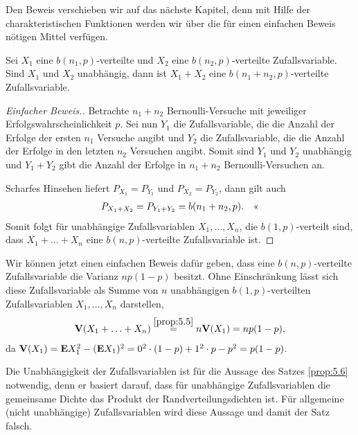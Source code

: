 Den Beweis verschieben wir auf das nächste Kapitel, denn mit Hilfe der
charakteristischen Funktionen werden wir über die für einen einfachen Beweis
nötigen Mittel verfügen.


\begin{bsp}
Sei $X_1$ eine $b(n_1,p)$-verteilte und $X_2$ eine $b(n_2,p)$-verteilte
Zufallsvariable. Sind $X_1$ und $X_2$ unabhängig, dann ist $X_1+X_2$ eine
$b(n_1+n_2,p)$-verteilte Zufallsvariable.

\begin{proof}[Einfacher Beweis.]
Betrachte $n_1+n_2$ Bernoulli-Versuche mit jeweiliger Erfolgswahrscheinlichkeit
$p$. Sei nun $Y_1$ die Zufallsvariable, die die
Anzahl der Erfolge der ersten $n_1$ Versuche angibt und $Y_2$ die
Zufallsvariable, die die Anzahl der Erfolge in den letzten $n_2$ Versuchen
angibt. Somit sind $Y_1$ und $Y_2$ unabhängig und $Y_1+Y_2$ gibt die Anzahl der
Erfolge in $n_1+n_2$ Bernoulli-Versuchen an.

Scharfes Hinsehen liefert $P_{X_1}=P_{Y_1}$ und $P_{X_2}=P_{Y_2}$, dann gilt
auch
\begin{align*}
P_{X_1+X_2}=P_{Y_1+Y_2}=b(n_1+n_2,p).\qedhere
\end{align*}
Somit folgt für unabhängige Zufallsvariablen $X_1,\ldots,X_n$, die
$b(1,p)$-verteilt sind, dass
$X_1+\ldots+X_n$ eine $b(n,p)$-verteilte Zufallsvariable ist.\bsphere
\end{proof}
\end{bsp}

\begin{bsp}
Wir können jetzt einen einfachen Beweis dafür geben, dass eine
$b(n,p)$-verteilte Zufallsvariable die Varianz $np(1-p)$ besitzt. Ohne
Einschränkung lässt sich diese Zufallsvariable als Summe von $n$ unabhängigen
$b(1,p)$-verteilten Zufallsvariablen $X_1,\ldots,X_n$ darstellen,
\begin{align*}
\V(X_1+\ldots+X_n) \overset{\ref{prop:5.5}}{=} n\V(X_1) = np(1-p),
\end{align*}
da $\V(X_1) = \E X_1^2 - (\E X_1)^2 = 0^2\cdot (1-p) + 1^2\cdot p - p^2 =
p(1-p)$.\bsphere
\end{bsp}

Die Unabhängigkeit der Zufallsvariablen ist für die Aussage des Satzes
\ref{prop:5.6} notwendig, denn er basiert darauf, dass für unabhängige
Zufallsvariablen die gemeinsame Dichte das Produkt der Randverteilungsdichten ist. Für
allgemeine (nicht unabhängige) Zufallsvariablen wird diese Aussage und damit der
Satz falsch.


